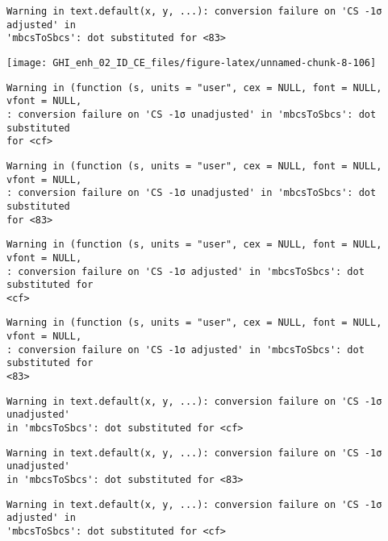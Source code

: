 \documentclass[
  10pt,
  a4paper,oneside]{article}
\begin{document}
\begin{verbatim}
Warning in text.default(x, y, ...): conversion failure on 'CS -1σ adjusted' in
'mbcsToSbcs': dot substituted for <83>
\end{verbatim}

\begin{center}\texttt{[image: GHI\_enh\_02\_ID\_CE\_files/figure-latex/unnamed-chunk-8-106]} \end{center}

\begin{verbatim}
Warning in (function (s, units = "user", cex = NULL, font = NULL, vfont = NULL,
: conversion failure on 'CS -1σ unadjusted' in 'mbcsToSbcs': dot substituted
for <cf>
\end{verbatim}

\begin{verbatim}
Warning in (function (s, units = "user", cex = NULL, font = NULL, vfont = NULL,
: conversion failure on 'CS -1σ unadjusted' in 'mbcsToSbcs': dot substituted
for <83>
\end{verbatim}

\begin{verbatim}
Warning in (function (s, units = "user", cex = NULL, font = NULL, vfont = NULL,
: conversion failure on 'CS -1σ adjusted' in 'mbcsToSbcs': dot substituted for
<cf>
\end{verbatim}

\begin{verbatim}
Warning in (function (s, units = "user", cex = NULL, font = NULL, vfont = NULL,
: conversion failure on 'CS -1σ adjusted' in 'mbcsToSbcs': dot substituted for
<83>
\end{verbatim}

\begin{verbatim}
Warning in text.default(x, y, ...): conversion failure on 'CS -1σ unadjusted'
in 'mbcsToSbcs': dot substituted for <cf>
\end{verbatim}

\begin{verbatim}
Warning in text.default(x, y, ...): conversion failure on 'CS -1σ unadjusted'
in 'mbcsToSbcs': dot substituted for <83>
\end{verbatim}

\begin{verbatim}
Warning in text.default(x, y, ...): conversion failure on 'CS -1σ adjusted' in
'mbcsToSbcs': dot substituted for <cf>
\end{verbatim}
\end{document}
